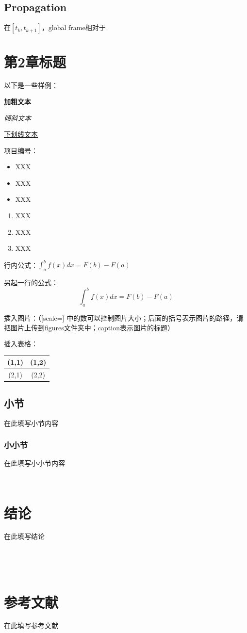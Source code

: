 \documentclass[a4paper, UTF8, fontset=adobe]{ctexart}
\begin{document}
\subsection{Propagation}

在$[t_k,t_{k+1}]$，global frame相对于

\section{第2章标题}

以下是一些样例：

\textbf{加粗文本}

\textit{倾斜文本}

\underline{下划线文本}

项目编号：

\begin{itemize}
    \item XXX
    \item XXX
    \item XXX
\end{itemize}

\begin{enumerate}
    \item XXX
    \item XXX
    \item XXX
\end{enumerate}

行内公式：$\int_a^b f(x)dx = F(b)-F(a)$

另起一行的公式：
\begin{equation}
    \int_a^b f(x)dx = F(b)-F(a)
\end{equation}

插入图片：（[scale=] 中的数可以控制图片大小；后面的括号表示图片的路径，请把图片上传到figures文件夹中；caption表示图片的标题）



插入表格：
\begin{tabular}{|c|c|}%
\hline  %
(1,1)&(1,2)\\
\hline  %
(2,1)&(2,2)\\
\hline %
\end{tabular}

\subsection{小节}

在此填写小节内容

\subsubsection{小小节}

在此填写小小节内容

\

\section{结论}

在此填写结论

\

\

\section*{参考文献}

在此填写参考文献
\end{document}
